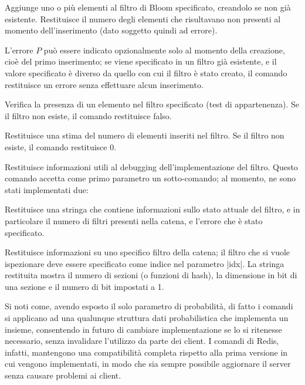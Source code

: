 \begin{description}[style=nextline,font={\bfseries\ttfamily}]
	\item[{BFADD key [ERROR p] ELEMENTS ele [ele2\dots]}] Aggiunge uno o più elementi al
	filtro di Bloom specificato, creandolo se non già esistente. Restituisce il numero degli
	elementi che risultavano non presenti al momento dell'inserimento (dato soggetto quindi ad
	errore).

	L'errore $P$ può essere indicato opzionalmente solo al momento della creazione, cioè del primo
	inserimento; se viene specificato in un filtro già esistente, e il valore specificato è diverso
	da quello con cui il filtro è stato creato, il comando restituisce un errore senza effettuare
	alcun inserimento.

	\item[BFEXIST key ele] Verifica la presenza di un elemento nel filtro specificato
	(test di appartenenza). Se il filtro non esiste, il comando restituisce falso.

	\item[BFCOUNT key] Restituisce una stima del numero di elementi inseriti nel filtro.
	Se il filtro non esiste, il comando restituisce $0$.

	\item[BFDEBUG] Restituisce informazioni utili al debugging dell'implementazione del
	filtro. Questo comando accetta come primo parametro un sotto-comando; al momento, ne sono stati
	implementati due:

		\begin{description}[style=nextline,font={\bfseries\ttfamily}]
		\item[BFDEBUG STATUS key] Restituisce una stringa che contiene informazioni sullo
		stato attuale del filtro, e in particolare il numero di filtri presenti nella catena, e
		l'errore che è stato specificato.

		\item[BFDEBUG FILTER key idx] Restituisce informazioni su uno specifico filtro
		della catena; il filtro che si vuole ispezionare deve essere specificato come indice 
		nel parametro \cverb|idx|. La stringa restituita mostra il numero di sezioni (o funzioni
		di hash), la dimensione in bit di una sezione e il numero di bit impostati a 1.
		\end{description}

\end{description}

Si noti come, avendo esposto il solo parametro di probabilità, di fatto i comandi si applicano ad
una qualunque struttura dati probabilistica che implementa un insieme, consentendo in futuro di
cambiare implementazione se lo si ritenesse necessario, senza invalidare l'utilizzo da parte dei
client. I comandi di Redis, infatti, mantengono una compatibilità completa rispetto alla prima
versione in cui vengono implementati, in modo che sia sempre possibile aggiornare il server senza
causare problemi ai client.

